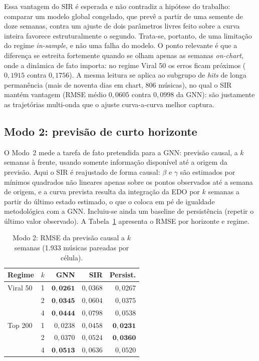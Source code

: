 Essa vantagem do SIR é esperada e não contradiz a hipótese do trabalho: comparar um modelo global congelado, que prevê a partir de uma semente de doze semanas, contra um ajuste de dois parâmetros livres feito sobre a curva inteira favorece estruturalmente o segundo. Trata-se, portanto, de uma limitação do regime \emph{in-sample}, e não uma falha do modelo. O ponto relevante é que a diferença se estreita fortemente quando se olham apenas as semanas \emph{on-chart}, onde a dinâmica de fato importa: no regime Viral 50 os erros ficam próximos ($0{,}1915$ contra $0{,}1756$). A mesma leitura se aplica ao subgrupo de \emph{hits} de longa permanência (mais de noventa dias em chart, 806 músicas), no qual o SIR mantém vantagem (RMSE médio $0{,}0605$ contra $0{,}0998$ da GNN): são justamente as trajetórias multi-onda que o ajuste curva-a-curva melhor captura.

\subsection{Modo 2: previsão de curto horizonte}

O Modo~2 mede a tarefa de fato pretendida para a GNN: previsão causal, a $k$ semanas à frente, usando somente informação disponível até a origem da previsão. Aqui o SIR é reajustado de forma causal: $\beta$ e $\gamma$ são estimados por mínimos quadrados não lineares apenas sobre os pontos observados até a semana de origem, e a curva prevista resulta da integração da EDO por $k$ semanas a partir do último estado estimado, o que o coloca em pé de igualdade metodológica com a GNN. Incluiu-se ainda um baseline de persistência (repetir o último valor observado). A Tabela~\ref{tab:phase3-mode2} apresenta o RMSE por horizonte e regime.

\begin{table}[htbp]
\centering
\caption{Modo 2: RMSE da previsão causal a $k$ semanas (1.933 músicas pareadas por célula).}
\label{tab:phase3-mode2}
\begin{tabular}{llrrr}
\hline
\textbf{Regime} & \textbf{$k$} & \textbf{GNN} & \textbf{SIR} & \textbf{Persist.} \\
\hline
Viral 50 & 1 & $\mathbf{0{,}0261}$ & $0{,}0368$ & $0{,}0267$ \\
         & 2 & $\mathbf{0{,}0345}$ & $0{,}0604$ & $0{,}0375$ \\
         & 4 & $\mathbf{0{,}0444}$ & $0{,}0798$ & $0{,}0538$ \\
Top 200  & 1 & $0{,}0238$ & $0{,}0458$ & $\mathbf{0{,}0231}$ \\
         & 2 & $0{,}0370$ & $0{,}0524$ & $\mathbf{0{,}0360}$ \\
         & 4 & $\mathbf{0{,}0513}$ & $0{,}0636$ & $0{,}0520$ \\
\hline
\end{tabular}
\end{table}


